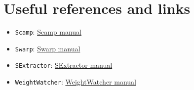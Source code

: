 \section{Useful references and links}

\begin{itemize}
\item {\tt Scamp}: \href{https://astromatic.iap.fr/pubsvn/software/scamp/trunk/doc/scamp.pdf}{Scamp manual}
\item {\tt Swarp}: \href{https://astromatic.iap.fr/pubsvn/software/swarp/trunk/doc/swarp.pdf}{Swarp manual}
\item {\tt SExtractor}: \href{https://astromatic.iap.fr/pubsvn/software/sextractor/trunk/doc/sextractor.pdf}{SExtractor manual}
\item {\tt WeightWatcher}: \href{https://astromatic.iap.fr/pubsvn/software/weightwatcher/trunk/doc/ww.pdf}{WeightWatcher manual}
\end{itemize}


